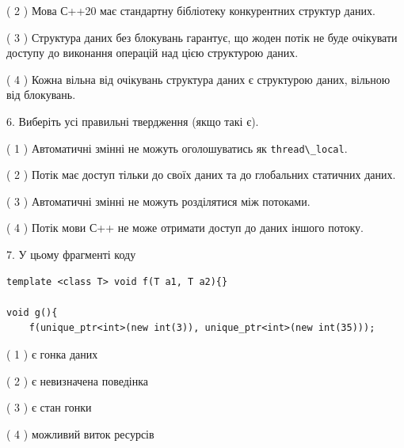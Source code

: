 \documentclass[12pt, ukrainian]{article}
\def\code#1{\Verb!#1!}
\begin{document}
\begin {large}
{( 2 ) Мова С++20 має стандартну бібліотеку конкурентних структур даних.%

( 3 ) Структура даних без блокувань гарантує, що жоден потік не буде очікувати доступу до виконання операцій над цією структурою даних.%

( 4 ) Кожна вільна від очікувань структура даних є структурою даних, вільною від блокувань.%
\newpage



\vspace{5mm}
6. Виберіть усі правильні твердження (якщо такі є).\par
\vspace{2mm}

( 1 ) Автоматичні змінні не можуть оголошуватись як \code{thread\_local}.%

( 2 ) Потік має доступ тільки до своїх даних та до глобальних статичних даних.%

( 3 ) Автоматичні змінні не можуть розділятися між потоками.%

( 4 ) Потік мови С++ не може отримати доступ до даних іншого потоку.%


\vspace{5mm}
7. У цьому фрагменті коду
\begin{verbatim}
template <class T> void f(T a1, T a2){}

void g(){
    f(unique_ptr<int>(new int(3)), unique_ptr<int>(new int(35)));
\end{verbatim}

( 1 ) є гонка даних%

( 2 ) є невизначена поведінка%

( 3 ) є стан гонки%

( 4 ) можливий виток ресурсів%
}
\end {large}
\end{document}
